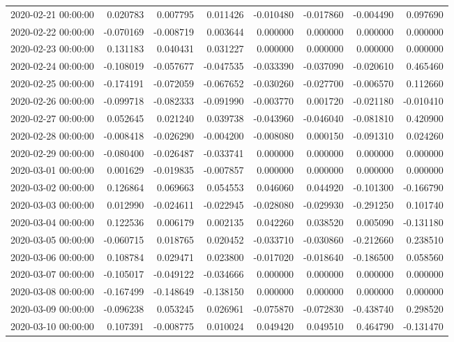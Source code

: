 \begin{tabular}{lrrrrrrr}
2020-02-21 00:00:00 & 0.020783 & 0.007795 & 0.011426 & -0.010480 & -0.017860 & -0.004490 & 0.097690 \\
2020-02-22 00:00:00 & -0.070169 & -0.008719 & 0.003644 & 0.000000 & 0.000000 & 0.000000 & 0.000000 \\
2020-02-23 00:00:00 & 0.131183 & 0.040431 & 0.031227 & 0.000000 & 0.000000 & 0.000000 & 0.000000 \\
2020-02-24 00:00:00 & -0.108019 & -0.057677 & -0.047535 & -0.033390 & -0.037090 & -0.020610 & 0.465460 \\
2020-02-25 00:00:00 & -0.174191 & -0.072059 & -0.067652 & -0.030260 & -0.027700 & -0.006570 & 0.112660 \\
2020-02-26 00:00:00 & -0.099718 & -0.082333 & -0.091990 & -0.003770 & 0.001720 & -0.021180 & -0.010410 \\
2020-02-27 00:00:00 & 0.052645 & 0.021240 & 0.039738 & -0.043960 & -0.046040 & -0.081810 & 0.420900 \\
2020-02-28 00:00:00 & -0.008418 & -0.026290 & -0.004200 & -0.008080 & 0.000150 & -0.091310 & 0.024260 \\
2020-02-29 00:00:00 & -0.080400 & -0.026487 & -0.033741 & 0.000000 & 0.000000 & 0.000000 & 0.000000 \\
2020-03-01 00:00:00 & 0.001629 & -0.019835 & -0.007857 & 0.000000 & 0.000000 & 0.000000 & 0.000000 \\
2020-03-02 00:00:00 & 0.126864 & 0.069663 & 0.054553 & 0.046060 & 0.044920 & -0.101300 & -0.166790 \\
2020-03-03 00:00:00 & 0.012990 & -0.024611 & -0.022945 & -0.028080 & -0.029930 & -0.291250 & 0.101740 \\
2020-03-04 00:00:00 & 0.122536 & 0.006179 & 0.002135 & 0.042260 & 0.038520 & 0.005090 & -0.131180 \\
2020-03-05 00:00:00 & -0.060715 & 0.018765 & 0.020452 & -0.033710 & -0.030860 & -0.212660 & 0.238510 \\
2020-03-06 00:00:00 & 0.108784 & 0.029471 & 0.023800 & -0.017020 & -0.018640 & -0.186500 & 0.058560 \\
2020-03-07 00:00:00 & -0.105017 & -0.049122 & -0.034666 & 0.000000 & 0.000000 & 0.000000 & 0.000000 \\
2020-03-08 00:00:00 & -0.167499 & -0.148649 & -0.138150 & 0.000000 & 0.000000 & 0.000000 & 0.000000 \\
2020-03-09 00:00:00 & -0.096238 & 0.053245 & 0.026961 & -0.075870 & -0.072830 & -0.438740 & 0.298520 \\
2020-03-10 00:00:00 & 0.107391 & -0.008775 & 0.010024 & 0.049420 & 0.049510 & 0.464790 & -0.131470 \\

\end{tabular}
